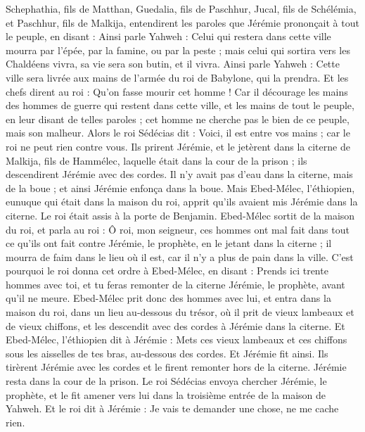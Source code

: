 \begin{multicols}{2}
\VerseOne{}Schephathia, fils de Matthan, Guedalia, fils de Paschhur, Jucal, fils de Schélémia, et Paschhur, fils de Malkija, entendirent les paroles que Jérémie prononçait à tout le peuple, en disant :
Ainsi parle Yahweh : Celui qui restera dans cette ville mourra par l'épée, par la famine, ou par la peste ; mais celui qui sortira vers les Chaldéens vivra, sa vie sera son butin, et il vivra.
Ainsi parle Yahweh : Cette ville sera livrée aux mains de l'armée du roi de Babylone, qui la prendra.
Et les chefs dirent au roi : Qu'on fasse mourir cet homme ! Car il décourage les mains des hommes de guerre qui restent dans cette ville, et les mains de tout le peuple, en leur disant de telles paroles ; cet homme ne cherche pas le bien de ce peuple, mais son malheur.
Alors le roi Sédécias dit : Voici, il est entre vos mains ; car le roi ne peut rien contre vous.
Ils prirent Jérémie, et le jetèrent dans la citerne de Malkija, fils de Hammélec, laquelle était dans la cour de la prison ; ils descendirent Jérémie avec des cordes. Il n'y avait pas d'eau dans la citerne, mais de la boue ; et ainsi Jérémie enfonça dans la boue.
Mais Ebed-Mélec, l'éthiopien, eunuque qui était dans la maison du roi, apprit qu'ils avaient mis Jérémie dans la citerne. Le roi était assis à la porte de Benjamin.
Ebed-Mélec sortit de la maison du roi, et parla au roi :
Ô roi, mon seigneur, ces hommes ont mal fait dans tout ce qu'ils ont fait contre Jérémie, le prophète, en le jetant dans la citerne ; il mourra de faim dans le lieu où il est, car il n'y a plus de pain dans la ville.
C'est pourquoi le roi donna cet ordre à Ebed-Mélec, en disant : Prends ici trente hommes avec toi, et tu feras remonter de la citerne Jérémie, le prophète, avant qu'il ne meure.
Ebed-Mélec prit donc des hommes avec lui, et entra dans la maison du roi, dans un lieu au-dessous du trésor, où il prit de vieux lambeaux et de vieux chiffons, et les descendit avec des cordes à Jérémie dans la citerne.
Et Ebed-Mélec, l'éthiopien dit à Jérémie : Mets ces vieux lambeaux et ces chiffons sous les aisselles de tes bras, au-dessous des cordes. Et Jérémie fit ainsi.
Ils tirèrent Jérémie avec les cordes et le firent remonter hors de la citerne. Jérémie resta dans la cour de la prison.
Le roi Sédécias envoya chercher Jérémie, le prophète, et le fit amener vers lui dans la troisième entrée de la maison de Yahweh. Et le roi dit à Jérémie : Je vais te demander une chose, ne me cache rien.

\end{multicols}
